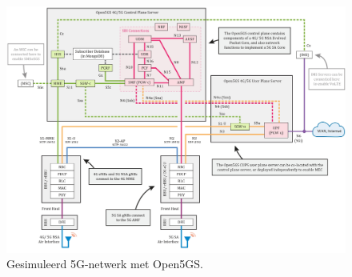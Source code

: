 \chapter{}%
\label{ch:poc1}

\begin{figure}
    \includegraphics[width=\linewidth]{../graphics/Open5GS-Schema.jpg}
    \caption{Gesimuleerd 5G-netwerk met Open5GS. \autocite[Door][Copyright 2021 van \citeauthor{Lee2021}]{Lee2021}}
    \label{fig:open5gs-schema}
\end{figure}